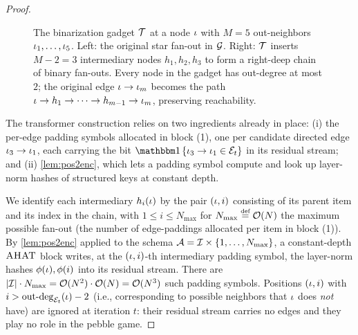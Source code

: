 \documentclass{article}
\begin{document}
\begin{proof}
\begin{figure}[H]
        \caption{The binarization gadget ${{ \mathcal{T}}}$ at a node ${{ \iota}}$ with $M = 5$ out-neighbors ${{ \iota}}_1, \ldots, {{ \iota}}_5$. Left: the original star fan-out in ${ \mathcal{G}}$. Right: ${{ \mathcal{T}}}$ inserts $M - 2 = 3$ \textcolor{ETHPurple!80!black}{intermediary nodes} $h_1, h_2, h_3$ to form a right-deep chain of binary fan-outs. Every node in the gadget has out-degree at most $2$; the original edge ${{ \iota}} \to {{ \iota}}_m$ becomes the path ${{ \iota}} \to h_1 \to \cdots \to h_{m-1} \to {{ \iota}}_m$, preserving reachability.}
        \label{fig:binarization}
    \end{figure}
    The transformer construction relies on two ingredients already in place: (i) the per-edge padding symbols allocated in block (1), one per candidate directed edge ${{ \iota}}_3 \to {{ \iota}}_1$, each carrying the bit $\ind{\itm_3 \to \itm_1 \in \edges_t}$ in its residual stream; and (ii) \cref{lem:pos2enc}, which lets a padding symbol compute and look up layer-norm hashes of structured keys at constant depth.
    
    We identify each intermediary $h_i({{ \iota}})$ by the pair $({{ \iota}}, i)$ consisting of its parent item and its index in the chain, with $1 \le i \le N_\text{max}$ for $N_\text{max} \defeq \bigo(\idxn)$ the maximum possible fan-out (the number of edge-paddings allocated per item in block (1)).
    By \cref{lem:pos2enc} applied to the schema ${{{{ \mathcal{A}}}}} = {{\mathcal{I}}} \times {{\{ 1, \ldots, N_\text{max} \}}}$, a constant-depth ${{\textsc{AHAT}}}$ block writes, at the $({{ \iota}}, i)$-th intermediary padding symbol, the layer-norm hashes $\phi({{ \iota}}), \phi(i)$ into its residual stream.
    There are $|{{\mathcal{I}}}| \cdot N_\text{max} = {{ \mathcal{O}}}({{ N}}^2) \cdot {{ \mathcal{O}}}({{ N}}) = {{ \mathcal{O}}}({{ N}}^3)$ such padding symbols.
    Positions $({{ \iota}}, i)$ with $i > \mathrm{out\text{-}deg}_{{\mathcal{E}}_t}({{ \iota}}) - 2$ (i.e., corresponding to possible neighbors that ${{ \iota}}$ does \emph{not} have) are ignored at iteration $t$: their residual stream carries no edges and they play no role in the pebble game.
    

\end{proof}
\end{document}
